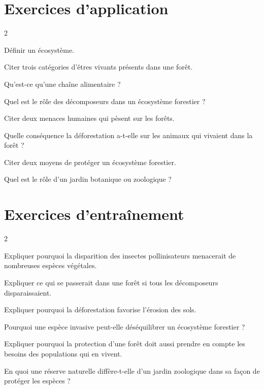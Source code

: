 \section{Exercices d'application}
\begin{multicols}{2}

\exo{} Définir un écosystème.

\exo{} Citer trois catégories d'êtres vivants présents dans une forêt.

\exo{} Qu'est-ce qu'une chaîne alimentaire ?

\exo{} Quel est le rôle des décomposeurs dans un écosystème forestier ?

\exo{} Citer deux menaces humaines qui pèsent sur les forêts.

\exo{} Quelle conséquence la déforestation a-t-elle sur les animaux qui
vivaient dans la forêt ?

\exo{} Citer deux moyens de protéger un écosystème forestier.

\exo{} Quel est le rôle d'un jardin botanique ou zoologique ?

\end{multicols}

\section{Exercices d'entraînement}
\begin{multicols}{2}

\exo{} Expliquer pourquoi la disparition des insectes pollinisateurs
menacerait de nombreuses espèces végétales.

\exo{} Expliquer ce qui se passerait dans une forêt si tous les décomposeurs
disparaissaient.

\exo{} Expliquer pourquoi la déforestation favorise l'érosion des sols.

\exo{} Pourquoi une espèce invasive peut-elle déséquilibrer un écosystème
forestier ?

\exo{} Expliquer pourquoi la protection d'une forêt doit aussi prendre en
compte les besoins des populations qui en vivent.

\exo{} En quoi une réserve naturelle diffère-t-elle d'un jardin zoologique
dans sa façon de protéger les espèces ?

\end{multicols}

